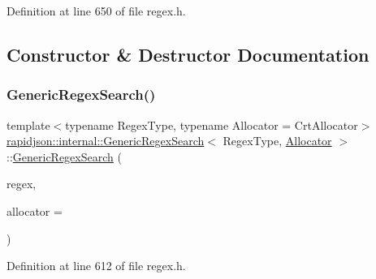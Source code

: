 Definition at line 650 of file regex.\+h.



\subsection{Constructor \& Destructor Documentation}
\mbox{\label{classrapidjson_1_1internal_1_1_generic_regex_search_abcdf4718410c956bbb410b68c27d72db}} 
\subsubsection{\texorpdfstring{GenericRegexSearch()}{GenericRegexSearch()}}
{\footnotesize\ttfamily template$<$typename Regex\+Type, typename Allocator = Crt\+Allocator$>$ \\
\mbox{\hyperlink{classrapidjson_1_1internal_1_1_generic_regex_search}{rapidjson\+::internal\+::\+Generic\+Regex\+Search}}$<$ Regex\+Type, \mbox{\hyperlink{classrapidjson_1_1_allocator}{Allocator}} $>$\+::\mbox{\hyperlink{classrapidjson_1_1internal_1_1_generic_regex_search}{Generic\+Regex\+Search}} (\begin{DoxyParamCaption}\item[{const Regex\+Type \&}]{regex,  }\item[{\mbox{\hyperlink{classrapidjson_1_1_allocator}{Allocator}} $\ast$}]{allocator = {} }\end{DoxyParamCaption})}



Definition at line 612 of file regex.\+h.


